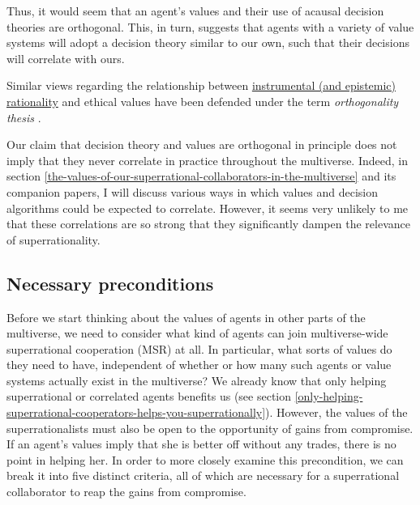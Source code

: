 Thus, it would seem that an agent's values and their use of acausal
decision theories are orthogonal. This, in turn, suggests that agents
with a variety of value systems will adopt a decision theory similar to
our own, such that their decisions will correlate with ours.

Similar views regarding the relationship between
\href{http://lesswrong.com/lw/31/what_do_we_mean_by_rationality/}{instrumental
(and epistemic) rationality} and ethical values have been defended
under the term \emph{orthogonality thesis}
\parencite{Bostrom2014-pc,Bostrom2012-hj,Armstrong2013-xo}.

Our claim that decision theory and values are orthogonal in principle
does not imply that they never correlate in practice throughout the
multiverse. Indeed, in section
\ref{the-values-of-our-superrational-collaborators-in-the-multiverse} and its
companion papers, I will discuss various ways in which values and
decision algorithms could be expected to correlate. However, it seems
very unlikely to me that these correlations are so strong that they
significantly dampen the relevance of superrationality.

\hypertarget{necessary-preconditions}{\subsection{Necessary
preconditions}\label{necessary-preconditions}}

Before we start thinking about the values of agents in other parts of
the multiverse, we need to consider what kind of agents can join
multiverse-wide superrational cooperation (MSR) at all. In particular,
what sorts of values do they need to have, independent of whether or how
many such agents or value systems actually exist in the multiverse? We
already know that only helping superrational or correlated agents
benefits us (see section
\ref{only-helping-superrational-cooperators-helps-you-superrationally}).
However, the values of the superrationalists must also be open to the
opportunity of gains from compromise. If an agent's values imply that
she is better off without any trades, there is no point in helping her.
In order to more closely examine this precondition, we can break it into
five distinct criteria, all of which are necessary for a superrational
collaborator to reap the gains from compromise.

